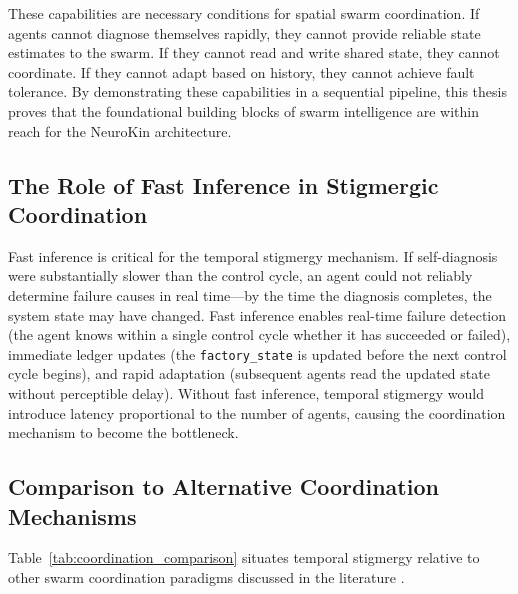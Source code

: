 \documentclass[12pt,a4paper,oneside]{report}
\begin{document}
These capabilities are necessary conditions for spatial swarm coordination. If agents cannot diagnose themselves rapidly, they cannot provide reliable state estimates to the swarm. If they cannot read and write shared state, they cannot coordinate. If they cannot adapt based on history, they cannot achieve fault tolerance. By demonstrating these capabilities in a sequential pipeline, this thesis proves that the foundational building blocks of swarm intelligence are within reach for the NeuroKin architecture.

\subsection{The Role of Fast Inference in Stigmergic Coordination}
\label{subsec:the_role_of_fast_inference_in_stigmergic_coordination}

Fast inference is critical for the temporal stigmergy mechanism. If self-diagnosis were substantially slower than the control cycle, an agent could not reliably determine failure causes in real time—by the time the diagnosis completes, the system state may have changed. Fast inference enables real-time failure detection (the agent knows within a single control cycle whether it has succeeded or failed), immediate ledger updates (the \texttt{factory\_state} is updated before the next control cycle begins), and rapid adaptation (subsequent agents read the updated state without perceptible delay). Without fast inference, temporal stigmergy would introduce latency proportional to the number of agents, causing the coordination mechanism to become the bottleneck.

\subsection{Comparison to Alternative Coordination Mechanisms}
\label{subsec:comparison_to_alternative_coordination_mechanisms}

Table~\ref{tab:coordination_comparison} situates temporal stigmergy relative to other swarm coordination paradigms discussed in the literature \cite{bongard2006resilient, cully2015robots, domberg2026selfadapting}.
\end{document}
